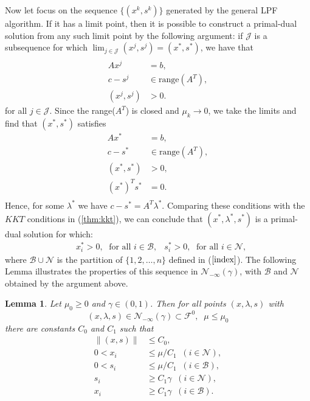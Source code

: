 \documentclass[a4paper,10 pt,titlepage,twoside]{book}
\theoremstyle{plain}
\newtheorem{lem}[thm]{Lemma}
\theoremstyle{definition}
\theoremstyle{remark}
\begin{document}
Now let focus on the sequence $\{(x^{k},s^{k})\}$ generated by the general LPF algorithm. If it has a limit point, then it is possible to construct a primal-dual solution from any such limit point by the following argument: if $\mathcal{J}$ is a subsequence for which $\lim_{j\in\mathcal{J}}(x^{j},s^{j})=(x^{*},s^{*})$, we have that
\begin{alignat*}
\\
Ax^{j}&= b,\\
c - s^{j}&\in\text{range}(A^{T}),\\ (x^{j},s^{j})&>0.
\end{alignat*}
 for all $j\in\mathcal{J}$. Since the range($A^{T}$) is closed and $\mu_{k}\to 0$, we take the limits and find that $(x^{*},s^{*})$ satisfies
\begin{align*}
Ax^{*}&= b,\\c-s^{*}&\in\text{range}(A^{T}),\\(x^{*},s^{*})&>0,\\(x^{*})^{T}s^{*}&=0.\\
\end{align*}
Hence, for some $\lambda^{*}$ we have $c-s^{*}= A^{T}\lambda^{*}$. Comparing these conditions with the $KKT$ conditions in (\ref{thm:kkt}), we can conclude that $(x^{*},\lambda^{*},s^{*})$ is a primal-dual solution for which:
\begin{align*}
&x^{*}_{i}>0,\; \text{ for all } i \in\mathcal{B},
&s^{*}_{i}>0,\; \text{ for all } i \in\mathcal{N},
\end{align*}
where $\mathcal{B}\cup\mathcal{N}$ is the partition of $\{1,2,\dots,n\}$ defined in ($\ref{index}$).
The following Lemma illustrates the properties of this sequence in $\mathcal{N}_{-\infty}(\gamma)$, with $\mathcal{B}$ and $\mathcal{N}$ obtained by the argument above.
\begin{lem}
	Let $\mu_{0}\geq 0$ and $\gamma\in(0,1)$. Then for all points $(x,\lambda,s)$ with
	\begin{equation*}
	(x,\lambda,s)\in\mathcal{N}_{-\infty}(\gamma)\subset\mathcal{F}^{0}, \;\; \mu \leq \mu_{0}
	\end{equation*}
	there are constants $C_{0}$ and $C_{1}$ such that
	\begin{align*}
	\lVert(x,s) \rVert&\leq C_{0},\tag{B}\label{B}\\0< x_{i}&\leq \mu/C_{1}\;\; (i \in\mathcal{N}),\\
	0< s_{i}&\leq \mu/C_{1}\;\; (i \in\mathcal{B}),\\ 
	s_{i}&\geq C_{1}\gamma \;\; (i \in\mathcal{N}),\\
	x_{i}&\geq C_{1}\gamma \;\; (i \in\mathcal{B}).\\
	\end{align*}
\end{lem}
\end{document}
